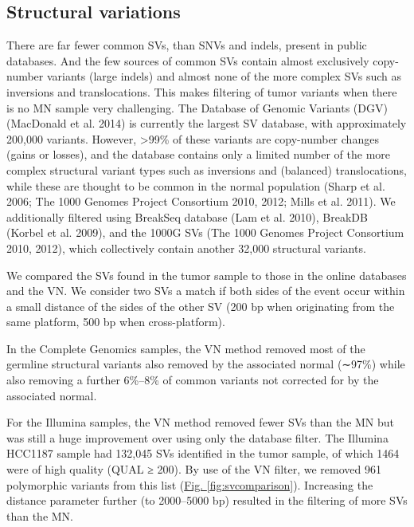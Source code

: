 \subsection*{Structural variations}

There are far fewer common SVs, than SNVs and indels, present in public databases. And the few sources of common SVs contain almost exclusively copy-number variants (large indels) and almost none of the more complex SVs such as inversions and translocations. This makes filtering of tumor variants when there is no MN sample very challenging. The Database of Genomic Variants (DGV) (MacDonald et al. 2014) is currently the largest SV database, with approximately 200,000 variants. However, >99\% of these variants are copy-number changes (gains or losses), and the database contains only a limited number of the more complex structural variant types such as inversions and (balanced) translocations, while these are thought to be common in the normal population (Sharp et al. 2006; The 1000 Genomes Project Consortium 2010, 2012; Mills et al. 2011). We additionally filtered using BreakSeq database (Lam et al. 2010), BreakDB (Korbel et al. 2009), and the 1000G SVs (The 1000 Genomes Project Consortium 2010, 2012), which collectively contain another 32,000 structural variants.

We compared the SVs found in the tumor sample to those in the online databases and the VN. We consider two SVs a match if both sides of the event occur within a small distance of the sides of the other SV (200 bp when originating from the same platform, 500 bp when cross-platform).

In the Complete Genomics samples, the VN method removed most of the germline structural variants also removed by the associated normal (∼97\%) while also removing a further 6\%–8\% of common variants not corrected for by the associated normal.

For the Illumina samples, the VN method removed fewer SVs than the MN but was still a huge improvement over using only the database filter. The Illumina HCC1187 sample had 132,045 SVs identified in the tumor sample, of which 1464 were of high quality (QUAL ≥ 200). By use of the VN filter, we removed 961 polymorphic variants from this list (\hyperref[fig:svcomparison]{Fig. \ref{fig:svcomparison}}). Increasing the distance parameter further (to 2000–5000 bp) resulted in the filtering of more SVs than the MN.

